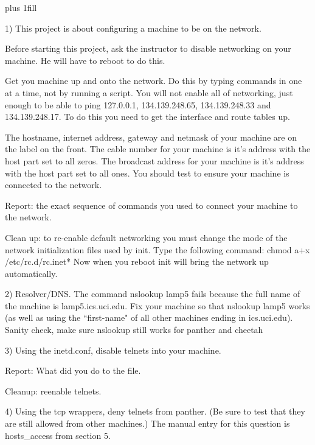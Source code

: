 
\rightskip=0pt plus 1fill

\parindent 0pt

1) This project is about configuring a machine to be on the network.

Before starting this project, ask the instructor to disable networking
on your machine. He will have to reboot to do this.

Get you machine up and onto the network.
Do this by typing commands in one at a time, not by running a script.
You will not enable all of networking, just enough to be
able to ping {\ltt{}127.0.0.1}, {\ltt{}134.139.248.65},
{\ltt{}134.139.248.33} and {\ltt{}134.139.248.17}.
To do this you need to get the interface and route tables up.

The hostname, internet address, gateway and netmask of your machine are
on the label on the front.
The cable number for your machine is it's address with the host
part set to all zeros.
The broadcast address for your machine is it's address with the host
part set to all ones.
You should test to ensure your machine is connected to the network.

Report: the exact sequence of commands you used to connect your machine
to the network.

Clean up: to re-enable default networking you must change the mode
of the network initialization files used by {\ltt{}init}.
Type the following command:
\hfill\break
{\ltt{}chmod a+x /etc/rc.d/rc.inet*}
\hfill\break
Now when you reboot {\ltt{}init} will bring the network up automatically.

2) Resolver/DNS. The command {\ltt{}nslookup lamp5} fails because the full
name of the machine is {\ltt{}lamp5.ics.uci.edu}.
Fix your machine so that {\ltt{}nslookup lamp5} works (as well as using
the ``first-name" of all other machines ending in {\ltt{}ics.uci.edu}).
Sanity check, make sure {\ltt{}nslookup} still works for {\ltt{}panther}
and {\ltt{}cheetah}

3) Using the {\ltt{}inetd.conf}, disable telnets into your machine.

Report: What did you do to the file.

Cleanup: reenable telnets.

4) Using the tcp wrappers, deny telnets from {\ltt{}panther}. (Be sure to test
that they are still allowed from other machines.)
The manual entry for this question is {\ltt{}hosts_access} from section 5.

